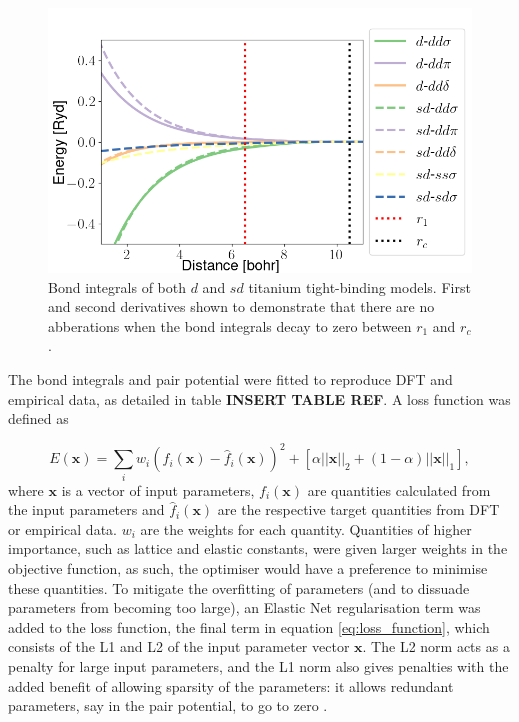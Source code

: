 \documentclass[11pt]{article}
\begin{document}
\begin{figure}[H]
  \begin{center}
    \includegraphics[width=\textwidth]{pictures/sd-d_bond_integrals_together.png}
    \caption[Bond integrals of both $d$ and $sd$ titanium tight-binding models.] {Bond integrals of both $d$ and $sd$ titanium tight-binding models. First and second derivatives shown to demonstrate that there are no abberations when the bond integrals decay to zero between $r_1$ and $r_c$.} %
    \label{fig:d_sd_bond_integrals}
  \end{center}
\end{figure}

The bond integrals and pair potential were fitted to reproduce DFT
and empirical data, as detailed in table \textbf{INSERT TABLE REF}.
A loss function was defined as

\begin{equation}
  E(\mathbf{x}) = \sum_i
  w_i(f_i(\mathbf{x}) - \hat{f}_i (\mathbf{x}))^2 + \left[   \alpha
  ||\mathbf{x}||_2 + (1-\alpha) || \mathbf{x} ||_1 \right],
  \label{eq:loss_function}
\end{equation}
where \(\mathbf{x}\) is a vector of input parameters, \(f_i(\mathbf{x})\) are quantities calculated from the
input parameters and \(\hat{f}_i(\mathbf{x})\) are the respective target quantities
from DFT or empirical data. \(w_i\) are the weights for each
quantity. Quantities of higher importance, such as lattice and
elastic constants, were given larger weights in the objective
function, as such, the optimiser would have a preference to
minimise these quantities. To mitigate the overfitting of
parameters (and to dissuade parameters from becoming too large), an Elastic Net regularisation
term was added to the loss function, the final term in equation
\eqref{eq:loss_function}, which consists of the L1 and L2 of the
input parameter vector \(\mathbf{x}\). The L2 norm acts as a penalty
for large input parameters, and the L1 norm also
gives penalties with the added benefit of allowing sparsity of the
parameters: it allows redundant parameters, say in the pair
potential, to go to zero \cite{Hastie2009,Bishop2006}.
\end{document}
